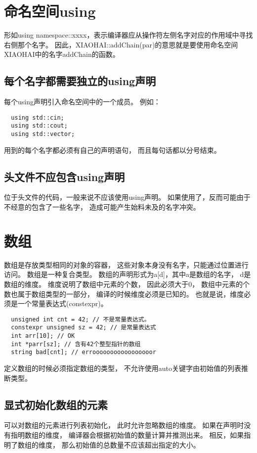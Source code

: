 \section{命名空间using}
形如using namespace::xxxx，表示编译器应从操作符左侧名字对应的作用域中寻找右侧那个名字。%
因此，XIAOHAI::addChain(par)的意思就是要使用命名空间XIAOHAI中的名字addChain的函数。%
\subsection{每个名字都需要独立的using声明}
每个using声明引入命名空间中的一个成员。%
例如：
\begin{lstlisting}
  using std::cin;
  using std::cout;
  using std::vector;
\end{lstlisting}
用到的每个名字都必须有自己的声明语句，%
而且每句话都以分号结束。%
\subsection{头文件不应包含using声明}
位于头文件的代码，一般来说不应该使用using声明。%
如果使用了，反而可能由于不经意的包含了一些名字，%
造成可能产生始料未及的名字冲突。%

\section{数组}
数组是存放类型相同的对象的容器，%
这些对象本身没有名字，只能通过位置进行访问。%
数组是一种复合类型。%
数组的声明形式为a[d]，其中a是数组的名字，%
d是数组的维度。%
维度说明了数组中元素的个数，%
因此必须大于0，%
数组中元素的个数也属于数组类型的一部分，%
编译的时候维度必须是已知的。%
也就是说，维度必须是一个常量表达式(constexpr)。%
\begin{lstlisting}
  unsigned int cnt = 42; // 不是常量表达式。
  constexpr unsigned sz = 42; // 是常量表达式
  int arr[10]; // OK
  int *parr[sz]; // 含有42个整型指针的数组
  string bad[cnt]; // errooooooooooooooooor
\end{lstlisting}
定义数组的时候必须指定数组的类型，%
不允许使用auto关键字由初始值的列表推断类型。%
\subsection{显式初始化数组的元素}
可以对数组的元素进行列表初始化，%
此时允许忽略数组的维度。%
如果在声明时没有指明数组的维度，%
编译器会根据初始值的数量计算并推测出来。%
相反，如果指明了数组的维度，%
那么初始值的总数量不应该超出指定的大小。%
